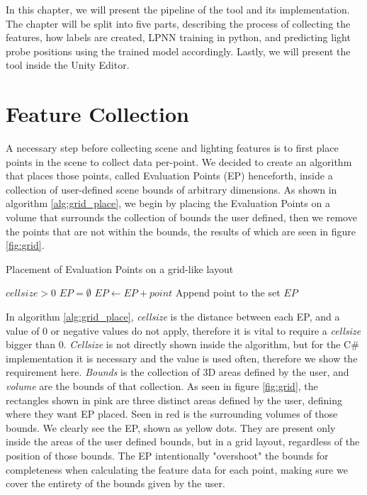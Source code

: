 In this chapter, we will present the pipeline of the tool and its implementation. The chapter will be split into five parts, describing the process of collecting the features, how labels are created, LPNN training in python, and predicting light probe positions using the trained model accordingly. Lastly, we will present the tool inside the Unity Editor.

\section{Feature Collection}
\label{sec:feature_collection}
A necessary step before collecting scene and lighting features is to first place points in the scene to collect data per-point. We decided to create an algorithm that places those points, called Evaluation Points (EP) henceforth, inside a collection of user-defined scene bounds of arbitrary dimensions. As shown in algorithm \ref{alg:grid_place}, we begin by placing the Evaluation Points on a volume that surrounds the collection of bounds the user defined, then we remove the points that are not within the bounds, the results of which are seen in figure \ref{fig:grid}.


\begin{algorithm}
	\caption{Placement of Evaluation Points on a grid-like layout}
	\label{alg:grid_place}
	\begin{algorithmic}[1]
		\Require $cellsize > 0$
		\State $EP = \emptyset$
				\State $EP \gets EP + point$ \Comment Append point to the set
			\EndIf
		\EndFor
		\State \Return $EP$
	\end{algorithmic}
\end{algorithm}

In algorithm \ref{alg:grid_place}, \textit{cellsize} is the distance between each EP, and a value of 0 or negative values do not apply, therefore it is vital to require a \textit{cellsize} bigger than 0. \textit{Cellsize} is not directly shown inside the algorithm, but for the C\# implementation it is necessary and the value is used often, therefore we show the requirement here. \textit{Bounds} is the collection of 3D areas defined by the user, and \textit{volume} are the bounds of that collection. As seen in figure \ref{fig:grid}, the rectangles shown in pink are three distinct areas defined by the user, defining where they want EP placed. Seen in red is the surrounding volumes of those bounds. We clearly see the EP, shown as yellow dots. They are present only inside the areas of the user defined bounds, but in a grid layout, regardless of the position of those bounds. The EP intentionally "overshoot" the bounds for completeness when calculating the feature data for each point, making sure we cover the entirety of the bounds given by the user.

